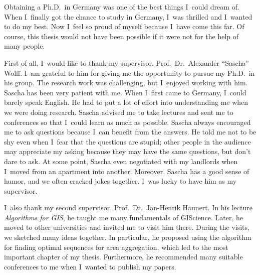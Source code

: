 Obtaining a Ph.D.\ in Germany was 
one of the best things I~could dream of.
When I~finally got the chance to study in Germany,
I~was thrilled and I~wanted to do my best.
Now I~feel so proud of myself because I~have come this far.
Of course, this thesis would not have been possible
if it were not for the help of many people.

First of all, I~would like to thank my supervisor, 
Prof.\ Dr.\ Alexander ``Sascha'' Wolff.
I~am grateful to him for giving me 
the opportunity to pursue my Ph.D.\ in his group.
The research work was challenging,
but I~enjoyed working with him.
Sascha has been very patient with me.
When I~first came to Germany, I~could barely speak English.
He had to put a lot of effort into understanding me
when we were doing research.
Sascha advised me to take lectures and sent me to conferences
so that I~could learn as much as possible.
Sascha always encouraged me to ask questions
because I~can benefit from the answers.
He told me not to be shy even when 
I~fear that the questions are stupid;
other people in the audience may appreciate my asking
because they may have the same questions,
but don't dare to ask.
At some point,
Sascha even negotiated with my landlords 
when I~moved from an apartment into another.
Moreover, Sascha has a good sense of humor, 
and we often cracked jokes together.
I~was lucky to have him as my supervisor.

I~also thank my second supervisor, 
Prof.\ Dr.\ Jan-Henrik Haunert.  
In his lecture \emph{Algorithms for GIS}, 
he taught me many fundamentals of GIScience.  
Later, he moved to other universities 
and invited me to visit him there.
During the visits, we sketched many ideas together.
In particular, he proposed %
using the \Astar algorithm 
for finding optimal sequences for area aggregation,
which led to the most important chapter of my thesis.
Furthermore, he recommended many suitable conferences to me
when I~wanted to publish my papers.


